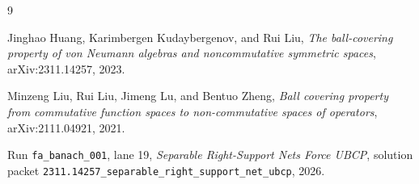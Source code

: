 \documentclass[11pt]{article}
\begin{document}
\begin{thebibliography}{9}

Jinghao Huang, Karimbergen Kudaybergenov, and Rui Liu,
\emph{The ball-covering property of von Neumann algebras and noncommutative
symmetric spaces},
arXiv:2311.14257, 2023.

Minzeng Liu, Rui Liu, Jimeng Lu, and Bentuo Zheng,
\emph{Ball covering property from commutative function spaces to
non-commutative spaces of operators},
arXiv:2111.04921, 2021.

Run \texttt{fa\_banach\_001}, lane 19,
\emph{Separable Right-Support Nets Force UBCP},
solution packet
\texttt{2311.14257\_separable\_right\_support\_net\_ubcp}, 2026.

\end{thebibliography}
\end{document}
